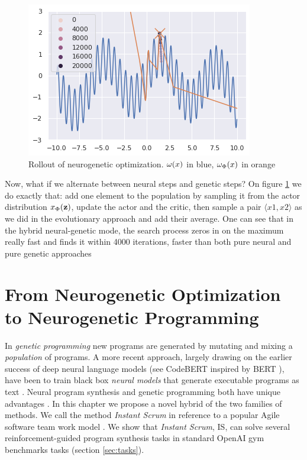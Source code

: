     
\begin{figure}
    \centering
    \includegraphics[width=0.8\linewidth]{images/neuropt4.png}
    \caption{Rollout of neurogenetic optimization. $ \omega(x) $ in blue, $ \omega_{\Phi}(x) $ in orange}
    \label{fig:neuropt-combined}
\end{figure}

Now, what if we alternate between neural steps and genetic steps?
On figure \ref{fig:neuropt-combined} we do exactly that: add one element to the population by sampling it from the actor distribution $ x_{\Phi}(\mathbf{z}) $, update the actor and the critic, then sample a pair $\langle x1,x2 \rangle$ as we did in the evolutionary approach and add their average.
One can see that in the hybrid neural-genetic mode, the search process zeros in on the maximum really fast and finds it within 4000 iterations, faster than both pure neural and pure genetic approaches 

\newpage
\section{From Neurogenetic Optimization to Neurogenetic Programming}

In \emph{genetic programming} \cite{genprog1,genprog2} new programs are generated by mutating and mixing a \emph{population} of programs. 
 A more recent approach, largely drawing on the earlier success of deep neural language models (see CodeBERT \cite{codebert} inspired by BERT \cite{devlinBERTPretrainingDeep2019}), have been to train black box \emph{neural models} that generate executable programs as text \cite{abolafiaNeuralProgramSynthesis2018,deepcoder,structural}. 
 Neural program synthesis and genetic programming both have unique advantages \cite{geneticvsneural}. 
 In this chapter we propose a novel hybrid of the two families of methods. We call the method \emph{Instant Scrum} in reference to a popular Agile software team work model \cite{scrum}. We show that \emph{Instant Scrum}, IS, can solve several reinforcement-guided program synthesis tasks in standard OpenAI gym benchmarks tasks (section \ref{sec:tasks}). 

